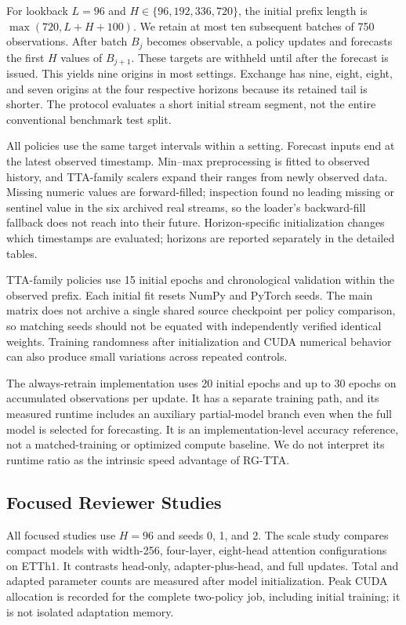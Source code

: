 \documentclass[conference]{IEEEtran}
\begin{document}
For lookback $L=96$ and $H\in\{96,192,336,720\}$, the initial prefix length is $\max(720,L+H+100)$. We retain at most ten subsequent batches of 750 observations. After batch $B_j$ becomes observable, a policy updates and forecasts the first $H$ values of $B_{j+1}$. These targets are withheld until after the forecast is issued. This yields nine origins in most settings. Exchange has nine, eight, eight, and seven origins at the four respective horizons because its retained tail is shorter. The protocol evaluates a short initial stream segment, not the entire conventional benchmark test split.

All policies use the same target intervals within a setting. Forecast inputs end at the latest observed timestamp. Min--max preprocessing is fitted to observed history, and TTA-family scalers expand their ranges from newly observed data. Missing numeric values are forward-filled; inspection found no leading missing or sentinel value in the six archived real streams, so the loader's backward-fill fallback does not reach into their future. Horizon-specific initialization changes which timestamps are evaluated; horizons are reported separately in the detailed tables.

TTA-family policies use 15 initial epochs and chronological validation within the observed prefix. Each initial fit resets NumPy and PyTorch seeds. The main matrix does not archive a single shared source checkpoint per policy comparison, so matching seeds should not be equated with independently verified identical weights. Training randomness after initialization and CUDA numerical behavior can also produce small variations across repeated controls.

The always-retrain implementation uses 20 initial epochs and up to 30 epochs on accumulated observations per update. It has a separate training path, and its measured runtime includes an auxiliary partial-model branch even when the full model is selected for forecasting. It is an implementation-level accuracy reference, not a matched-training or optimized compute baseline. We do not interpret its runtime ratio as the intrinsic speed advantage of RG-TTA.

\subsection{Focused Reviewer Studies}
All focused studies use $H=96$ and seeds 0, 1, and 2. The scale study compares compact models with width-256, four-layer, eight-head attention configurations on ETTh1. It contrasts head-only, adapter-plus-head, and full updates. Total and adapted parameter counts are measured after model initialization. Peak CUDA allocation is recorded for the complete two-policy job, including initial training; it is not isolated adaptation memory.
\end{document}
